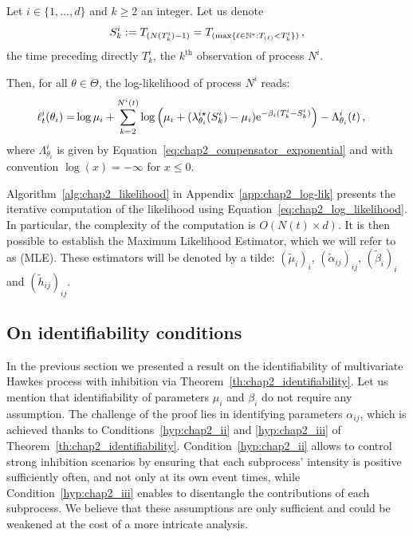     \begin{corollary}\label{cor:chap2_mle}
        Let \(i \in \{1, \dots, d\}\) and \(k\geq 2\) an integer.
        Let us denote
        \[
          S_k^i := T\park[N(T_k^i)-1]
          = T\park[\max\{\ell \in \mathbb N^* : {T\park[\ell]} < T_k^i\}] \,,
        \]
        the time preceding directly \(T_k^i\), the \(k^{\text{th}}\) observation of process \(N^i\).
        
        Then, for all \(\theta \in \Theta\),
        the log-likelihood of process \(N^i\) reads:
        \begin{align}\label{eq:chap2_log_likelihood}
            \ell^i_t(\theta_i) = &\log{\mu_i} + \sum_{k=2}^{N^i(t)}{\log{\adaptedpar{\mu_i + (\lambda^{i\star}_{\theta_i}(S_k^i) - \mu_i)\mathrm{e}^{-\beta_i(T_k^i - S_k^i)}}}} - \Lambda^i_{\theta_i}(t)\,,
        \end{align} where $\Lambda^i_{\theta_i}$ is given by Equation~\eqref{eq:chap2_compensator_exponential} and with convention $\log{(x)} = -\infty$ for $x\leq 0$.

    \end{corollary}

    Algorithm~\ref{alg:chap2_likelihood} in Appendix~\ref{app:chap2_log-lik} presents the iterative computation of the likelihood using Equation~\eqref{eq:chap2_log_likelihood}. In particular, the complexity of the computation is $O(N(t)\times d)$.
    It is then possible to establish the Maximum Likelihood Estimator, which we will refer to as (MLE). These estimators will be denoted by a tilde: $(\tilde\mu_i)_i$, $(\tilde\alpha_{ij})_{ij}$, $(\tilde\beta_i)_i$ and $(\tilde h_{ij})_{ij}$.

\subsection{On identifiability conditions}\label{sec:chap2_identifiability}

        In the previous section we presented a result on the identifiability of multivariate Hawkes process with inhibition via Theorem~\ref{th:chap2_identifiability}.
        Let us mention that identifiability of parameters \(\mu_i\) and \(\beta_i\) do not require any assumption.
	  The challenge of the proof lies in identifying parameters \(\alpha_{ij}\), which is achieved thanks to Conditions~\ref{hyp:chap2_ii} and \ref{hyp:chap2_iii} of Theorem~\ref{th:chap2_identifiability}.
	  Condition~\ref{hyp:chap2_ii} allows to control strong inhibition scenarios by ensuring that each subprocess' intensity is positive sufficiently often, and not only at its own event times,
	  while Condition~\ref{hyp:chap2_iii} enables to disentangle the contributions of each subprocess.
	  We believe that these assumptions are only sufficient and could be weakened at the cost of a more intricate analysis.

